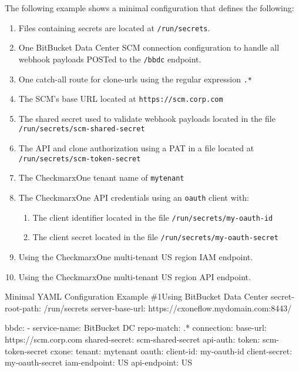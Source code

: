 The following example shows a minimal \cxoneflow configuration that defines the following:

\begin{enumerate}
    \item Files containing secrets are located at \texttt{/run/secrets}.
    \item One BitBucket Data Center SCM connection configuration to handle all webhook payloads
    POSTed to the \texttt{/bbdc} endpoint.
    \item One catch-all route for clone-urls using the regular expression \texttt{.*}
    \item The SCM's base URL located at \texttt{https://scm.corp.com}
    \item The shared secret used to validate webhook payloads located in the file \texttt{/run/secrets/scm-shared-secret}
    \item The API and clone authorization using a PAT in a file located at \texttt{/run/secrets/scm-token-secret}
    \item The CheckmarxOne tenant name of \texttt{mytenant}
    \item The CheckmarxOne API credentials using an \texttt{oauth} client with:
    \begin{enumerate}
        \item The client identifier located in the file \texttt{/run/secrets/my-oauth-id}
        \item The client secret located in the file \texttt{/run/secrets/my-oauth-secret}
    \end{enumerate}
    \item Using the CheckmarxOne multi-tenant US region IAM endpoint.
    \item Using the CheckmarxOne multi-tenant US region API endpoint.
\end{enumerate}

\begin{code}{Minimal YAML Configuration Example \#1}{Using BitBucket Data Center}{}
secret-root-path: /run/secrets
server-base-url: https://cxoneflow.mydomain.com:8443/

bbdc:
    - service-name: BitBucket DC
      repo-match: .*
      connection:
        base-url: https://scm.corp.com
        shared-secret: scm-shared-secret
        api-auth:
            token: scm-token-secret
      cxone:
        tenant: mytenant
        oauth:
            client-id: my-oauth-id
            client-secret: my-oauth-secret
        iam-endpoint: US
        api-endpoint: US
\end{code}

